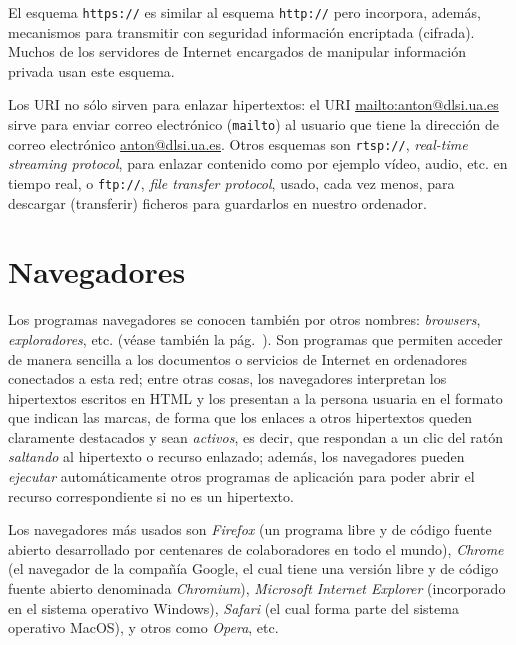 El esquema {\tt https://} es similar al esquema {\tt http://} pero incorpora, además, mecanismos para transmitir con seguridad información encriptada (cifrada). Muchos de los servidores de Internet encargados de manipular información privada usan este esquema. 

Los URI no sólo sirven para enlazar hipertextos: el URI \url{mailto:anton@dlsi.ua.es} sirve para enviar correo electrónico (\texttt{mailto}) al usuario que tiene la dirección de correo electrónico \url{anton@dlsi.ua.es}. Otros esquemas son \texttt{rtsp://}, \emph{real-time streaming protocol}, para enlazar contenido como por ejemplo vídeo, audio, etc. en tiempo real, o {\tt ftp://}, \emph{file transfer protocol}, usado, cada vez menos, para descargar (transferir) ficheros para guardarlos en nuestro ordenador\label{pg:ftp}. 

\section{Navegadores} \label{ss:navegadors} Los programas navegadores se conocen también por otros nombres: \emph{browsers}, \emph{exploradores}, etc. (véase también la pág.~\pageref{pg:navegadors}). Son programas que permiten acceder de manera sencilla a los documentos o servicios de Internet en ordenadores conectados a esta red; entre otras cosas, los navegadores interpretan los hipertextos escritos en HTML y los presentan a la persona usuaria en el formato que indican las marcas, de forma que los enlaces a otros hipertextos queden claramente destacados y sean \emph{activos}, es decir, que respondan a un clic del ratón \emph{saltando} al hipertexto o recurso enlazado; además, los navegadores pueden \emph{ejecutar} automáticamente otros programas de aplicación para poder abrir el recurso correspondiente si no es un hipertexto. 

Los navegadores más usados son \emph{Firefox} (un programa libre y de código fuente abierto desarrollado por centenares de colaboradores en todo el mundo), \emph{Chrome} (el navegador de la compañía Google, el cual tiene una versión libre y de código fuente abierto denominada \emph{Chromium}), \emph{Microsoft Internet Explorer} (incorporado en el sistema operativo Windows), \emph{Safari} (el cual forma parte del sistema operativo MacOS), y otros como \emph{Opera}, etc. 


